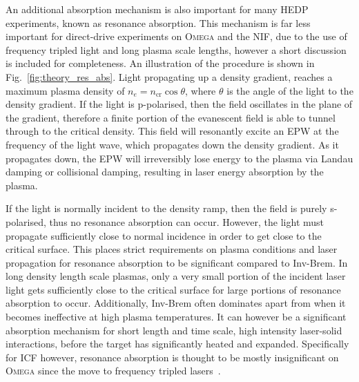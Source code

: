 An additional absorption mechanism is also important for many \ac{HEDP} experiments, known as resonance absorption.
This mechanism is far less important for direct-drive experiments on \textsc{Omega} and the \ac{NIF}, due to the use of frequency tripled light and long plasma scale lengths, however a short discussion is included for completeness.
An illustration of the procedure is shown in Fig.~\ref{fig:theory_res_abs}.
Light propagating up a density gradient, reaches a maximum plasma density of $n_e = n_{\text{cr}} \cos{\theta}$, where $\theta$ is the angle of the light to the density gradient.
If the light is p-polarised, then the field oscillates in the plane of the gradient, therefore a finite portion of the evanescent field is able to tunnel through to the critical density.
This field will resonantly excite an \ac{EPW} at the frequency of the light wave, which propagates down the density gradient.
As it propagates down, the \ac{EPW} will irreversibly lose energy to the plasma via Landau damping or collisional damping, resulting in laser energy absorption by the plasma.

If the light is normally incident to the density ramp, then the field is purely s-polarised, thus no resonance absorption can occur.
However, the light must propagate sufficiently close to normal incidence in order to get close to the critical surface.
This places strict requirements on plasma conditions and laser propagation for resonance absorption to be significant compared to \ac{Inv-Brem}.
In long density length scale plasmas, only a very small portion of the incident laser light gets sufficiently close to the critical surface for large portions of resonance absorption to occur.
Additionally, \ac{Inv-Brem} often dominates apart from when it becomes ineffective at high plasma temperatures.
It can however be a significant absorption mechanism for short length and time scale, high intensity laser-solid interactions, before the target has significantly heated and expanded.
Specifically for \ac{ICF} however, resonance absorption is thought to be mostly insignificant on \textsc{Omega} since the move to frequency tripled lasers~\cite{craxton_directdrive_2015}.

